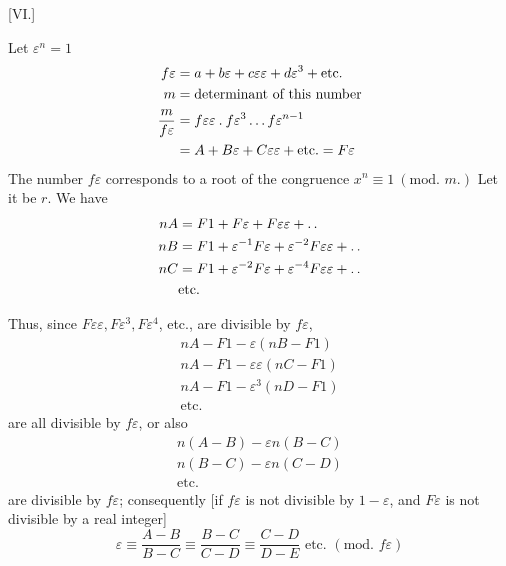 %
\begin{center}[VI.]\end{center}
Let $\varepsilon^n=1$
\[
\begin{aligned}
f\varepsilon&=a+b\varepsilon+c\varepsilon\varepsilon+d\varepsilon^3+\text{etc.}\\
m&=\text{determinant of this number}\\
\frac{m}{f\varepsilon}&=f\varepsilon\varepsilon\mathbin{.} f\varepsilon^3\ldots f\varepsilon^{n-1}\\
&=A+B\varepsilon+C\varepsilon\varepsilon+\text{etc.}=F\varepsilon
\end{aligned}
\]
The number $f\varepsilon$ corresponds to a root of the congruence $x^n\equiv1\ (\text{mod. }m.)$ Let it be $r$. We have
\[
\begin{aligned}
nA&=F1+F\varepsilon+F\varepsilon\varepsilon+\mathinner{.\,.}\\
nB&=F1+\varepsilon^{-1}F\varepsilon+\varepsilon^{-2}F\varepsilon\varepsilon+\mathinner{.\,.}\\
nC&=F1+\varepsilon^{-2}F\varepsilon+\varepsilon^{-4}F\varepsilon\varepsilon+\mathinner{.\,.}\\
&\text{etc.}
\end{aligned}
\]

Thus, since $F\varepsilon\varepsilon,F\varepsilon^3,F\varepsilon^4$, etc., are divisible by $f\varepsilon$,
\[
\begin{gathered}
nA-F1-\varepsilon(nB-F1)\\
nA-F1-\varepsilon\varepsilon(nC-F1)\\
nA-F1-\varepsilon^3(nD-F1)\\
\text{etc.}
\end{gathered}
\]
are all divisible by $f\varepsilon$, or also
\[
\begin{gathered}
n(A-B)-\varepsilon n(B-C)\\
n(B-C)-\varepsilon n(C-D)\\
\text{etc.}
\end{gathered}
\]
are divisible by $f\varepsilon$; consequently [if $f\varepsilon$ is not divisible by $1-\varepsilon$, and $F\varepsilon$ is not divisible by a real integer]
\[
\varepsilon\equiv\frac{A-B}{B-C}\equiv\frac{B-C}{C-D}\equiv\frac{C-D}{D-E}\text{ etc. }(\text{mod. }f\varepsilon)
\]

